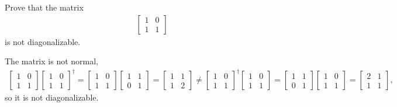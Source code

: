 \documentclass[en]{sol-man}
\begin{document}
\begin{exe}
    Prove that the matrix
    \begin{align}
        \begin{bmatrix}
            1&0\\
            1&1
        \end{bmatrix}
    \end{align}
    is not diagonalizable.
\end{exe}
\begin{pf}
    The matrix is not normal,
    \begin{align}
        \begin{bmatrix}
            1&0\\
            1&1
        \end{bmatrix}\begin{bmatrix}
            1&0\\
            1&1
        \end{bmatrix}^{\dagger}=\begin{bmatrix}
            1&0\\
            1&1
        \end{bmatrix}\begin{bmatrix}
            1&1\\
            0&1
        \end{bmatrix}=\begin{bmatrix}
            1&1\\
            1&2
        \end{bmatrix}\neq\begin{bmatrix}
            1&0\\
            1&1
        \end{bmatrix}^{\dagger}\begin{bmatrix}
            1&0\\
            1&1
        \end{bmatrix}=\begin{bmatrix}
            1&1\\
            0&1
        \end{bmatrix}\begin{bmatrix}
            1&0\\
            1&1
        \end{bmatrix}=\begin{bmatrix}
            2&1\\
            1&1
        \end{bmatrix},
    \end{align}
    so it is not diagonalizable.
\end{pf}
\end{document}
